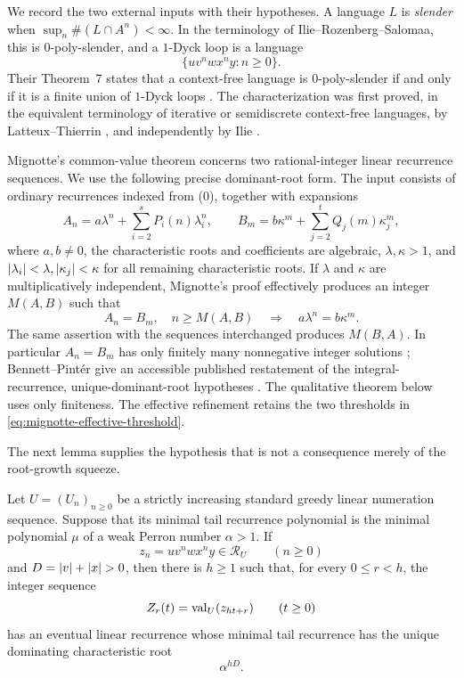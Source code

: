 We record the two external inputs with their hypotheses. A language \(L\)
is \emph{slender} when
\(\sup_n\#(L\cap A^n)<\infty\). In the terminology of
Ilie--Rozenberg--Salomaa, this is \(0\)-poly-slender, and a \(1\)-Dyck loop
is a language
\[
  \{u v^n w x^n y:n\ge0\}.
\]
Their Theorem~7 states that a context-free language is \(0\)-poly-slender
if and only if it is a finite union of \(1\)-Dyck loops
\cite[Theorem~7]{IlieRozenbergSalomaa2000}. The characterization was first
proved, in the equivalent terminology of iterative or semidiscrete
context-free languages, by Latteux--Thierrin
\cite{LatteuxThierrin1983}, and independently by Ilie
\cite{Ilie1994}.

Mignotte's common-value theorem concerns two rational-integer linear
recurrence sequences. We use the following precise dominant-root form. The
input consists of ordinary recurrences indexed from (0), together with
expansions
\[
  A_n=a\lambda^n+\sum_{i=2}^s P_i(n)\lambda_i^n,
  \qquad
  B_m=b\kappa^m+\sum_{j=2}^t Q_j(m)\kappa_j^m,
\]
where \(a,b\ne0\), the characteristic roots and coefficients are
algebraic, \(\lambda,\kappa>1\), and
\(
  \lvert \lambda_i \rvert<\lambda,
  \lvert \kappa_j \rvert<\kappa
\)
for all remaining characteristic roots. If \(\lambda\) and \(\kappa\)
are multiplicatively independent, Mignotte's proof effectively produces an
integer \(M(A,B)\) such that
\begin{equation}
  A_n=B_m,\quad n\ge M(A,B)
  \quad\Longrightarrow\quad
  a\lambda^n=b\kappa^m.
  \label{eq:mignotte-effective-threshold}
\end{equation}
The same assertion with the sequences interchanged produces \(M(B,A)\).
In particular \(A_n=B_m\) has only finitely many nonnegative integer
solutions \cite{Mignotte1978Intersection}; Bennett--Pint\'er give an
accessible published restatement of the integral-recurrence,
unique-dominant-root hypotheses \cite{BennettPinter2015}. The qualitative
theorem below uses only finiteness. The effective refinement retains the two
thresholds in \eqref{eq:mignotte-effective-threshold}.

The next lemma supplies the hypothesis that is not a consequence merely of
the root-growth squeeze.

\begin{lemma}
  \label{lem:paired-loop-dominant-root-transfer}
  Let \(U=(U_n)_{n\ge0}\) be a strictly increasing standard greedy linear
  numeration sequence. Suppose that its minimal tail recurrence
  polynomial is the minimal polynomial \(\mu\) of a weak Perron number
  \(\alpha>1\). If
  \[
    z_n=u v^n w x^n y\in\mathcal R_U\qquad(n\ge0)
  \]
  and \(D=\lvert v \rvert+\lvert x \rvert>0\), then there is \(h\ge1\) such that, for every
  \(0\le r<h\), the integer sequence
  \[
    Z_r(t)=\operatorname{val}_U(z_{ht+r})\qquad(t\ge0)
  \]
  has an eventual linear recurrence whose minimal tail recurrence has the
  unique dominating characteristic root
  \[
    \alpha^{hD}.
  \]
\end{lemma}

